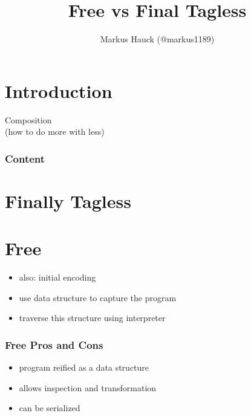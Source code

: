 \documentclass[aspectratio=169]{beamer}
\title{Free vs Final Tagless}
\author{Markus Hauck (@markus1189)}
\begin{document}
\begin{frame}
  \titlepage{}
\end{frame}

\section{Introduction}\label{sec:introduction}

\begin{frame}
  \begin{center}
    {\Huge Composition\\}
    (how to do more with less)
  \end{center}
\end{frame}

\begin{frame}[fragile]
  \frametitle{Content}
  \begin{center}
  \end{center}
\end{frame}

\section{Finally Tagless}\label{sec:finally-tagless}

\section{Free}\label{sec:free}

\begin{frame}
  \begin{itemize}
  \item also: initial encoding
  \item use data structure to capture the program
  \item traverse this structure using interpreter
  \end{itemize}
\end{frame}

\begin{frame}
  \frametitle{Free \textemdash{} Pros and Cons}
  \begin{itemize}
  \item program reified as a data structure
  \item allows inspection and transformation
  \item can be serialized
  \end{itemize}
\end{frame}
\end{document}
